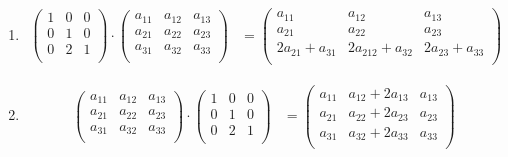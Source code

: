 \documentclass{article}
\begin{document}
\begin{enumerate}
    \item \begin{align*}
        \begin{pmatrix}
            1 & 0 & 0 \\
            0 & 1 & 0 \\
            0 & 2 & 1 \\
        \end{pmatrix} \cdot \begin{pmatrix}
            a_{11} & a_{12} & a_{13} \\
            a_{21} & a_{22} & a_{23} \\
            a_{31} & a_{32} & a_{33} \\
        \end{pmatrix} &= \begin{pmatrix}
            a_{11} & a_{12} & a_{13} \\
            a_{21} & a_{22} & a_{23} \\
            2a_{21} + a_{31} & 2a_{212} + a_{32} & 2a_{23} + a_{33} \\
        \end{pmatrix}
    \end{align*}

    \item \begin{align*}
        \begin{pmatrix}
            a_{11} & a_{12} & a_{13} \\
            a_{21} & a_{22} & a_{23} \\
            a_{31} & a_{32} & a_{33} \\
        \end{pmatrix} \cdot \begin{pmatrix}
            1 & 0 & 0 \\
            0 & 1 & 0 \\
            0 & 2 & 1 \\
        \end{pmatrix} &= \begin{pmatrix}
            a_{11} & a_{12} + 2a_{13} & a_{13} \\
            a_{21} & a_{22} + 2a_{23} & a_{23} \\
            a_{31} & a_{32} + 2a_{33} & a_{33} \\
        \end{pmatrix}
    \end{align*}


\end{enumerate}
\end{document}
